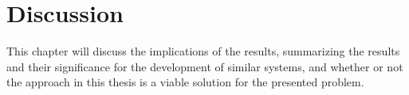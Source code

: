 \section{Discussion}
This chapter will discuss the implications of the results, summarizing the results and their significance for the development of similar systems, and whether or not the approach in this thesis is a viable solution for the presented problem. 
